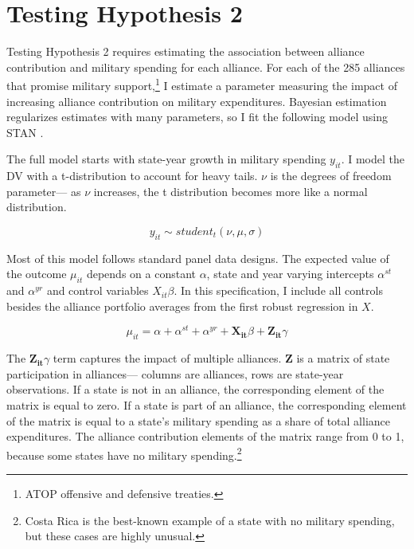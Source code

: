 \documentclass[12pt]{article}
\begin{document}
\section{Testing Hypothesis 2}


Testing Hypothesis 2 requires estimating the association between alliance contribution and military spending for each alliance.
For each of the 285 alliances that promise military support,\footnote{ATOP offensive and defensive treaties.} I estimate a parameter measuring the impact of increasing alliance contribution on military expenditures. 
Bayesian estimation regularizes estimates with many parameters, so I fit the following model using STAN \citep{Carpenteretal2016}.


The full model starts with state-year growth in military spending $y_{it}$.
I model the DV with a t-distribution to account for heavy tails.
$\nu$ is the degrees of freedom parameter--- as $\nu$ increases, the t distribution becomes more like a normal distribution. 


\begin{equation}
y_{it} \sim student_t(\nu, \mu, \sigma) 
\end{equation}


Most of this model follows standard panel data designs.
The expected value of the outcome $\mu_{it}$ depends on a constant $\alpha$, state and year varying intercepts $\alpha^{st}$ and $\alpha^{yr}$ and control variables $X_{it} \beta$. 
In this specification, I include all controls besides the alliance portfolio averages from the first robust regression in $X$.


\begin{equation}
\mu_{it} = \alpha + \alpha^{st} + \alpha^{yr} + \mathbf{X_{it}} \beta + \mathbf{Z_{it}} \gamma 
\end{equation}


The $\mathbf{Z_{it}} \gamma$ term captures the impact of multiple alliances. 
\textbf{Z} is a matrix of state participation in alliances--- columns are alliances, rows are state-year observations. 
If a state is not in an alliance, the corresponding element of the matrix is equal to zero. 
If a state is part of an alliance, the corresponding element of the matrix is equal to a state's military spending as a share of total alliance expenditures. 
The alliance contribution elements of the matrix range from 0 to 1, because some states have no military spending.\footnote{Costa Rica is the best-known example of a state with no military spending, but these cases are highly unusual.} 
\end{document}
